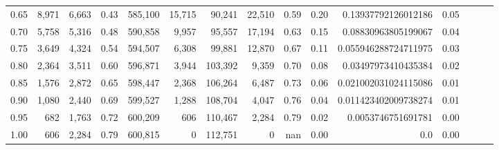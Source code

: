 \begin{tabular}{rrrrrrrrrrrrrrr}
0.65 &   8,971 &   6,663 &  0.43 &  585,100 &   15,715 &   90,241 &   22,510 &  0.59 &  0.20 &   0.13937792126012186 &      0.05 \\
0.70 &   5,758 &   5,316 &  0.48 &  590,858 &    9,957 &   95,557 &   17,194 &  0.63 &  0.15 &   0.08830963805199067 &      0.04 \\
0.75 &   3,649 &   4,324 &  0.54 &  594,507 &    6,308 &   99,881 &   12,870 &  0.67 &  0.11 &  0.055946288724711975 &      0.03 \\
0.80 &   2,364 &   3,511 &  0.60 &  596,871 &    3,944 &  103,392 &    9,359 &  0.70 &  0.08 &   0.03497973410435384 &      0.02 \\
0.85 &   1,576 &   2,872 &  0.65 &  598,447 &    2,368 &  106,264 &    6,487 &  0.73 &  0.06 &  0.021002031024115086 &      0.01 \\
0.90 &   1,080 &   2,440 &  0.69 &  599,527 &    1,288 &  108,704 &    4,047 &  0.76 &  0.04 &  0.011423402009738274 &      0.01 \\
0.95 &     682 &   1,763 &  0.72 &  600,209 &      606 &  110,467 &    2,284 &  0.79 &  0.02 &    0.0053746751691781 &      0.00 \\
1.00 &     606 &   2,284 &  0.79 &  600,815 &        0 &  112,751 &        0 &   nan &  0.00 &                   0.0 &      0.00 \\
\bottomrule
\end{tabular}
